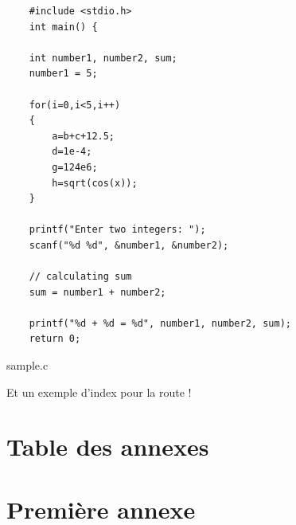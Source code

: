 \documentclass[a4paper,11pt]{report}    %
\begin{document}
\begin{listing}[H]
\begin{verbatim}
    #include <stdio.h>
    int main() {

    int number1, number2, sum;
    number1 = 5;

    for(i=0,i<5,i++)
    {
        a=b+c+12.5;
        d=1e-4;
        g=124e6;
        h=sqrt(cos(x));
    }

    printf("Enter two integers: ");
    scanf("%d %d", &number1, &number2);

    // calculating sum
    sum = number1 + number2;

    printf("%d + %d = %d", number1, number2, sum);
    return 0;
\end{verbatim}
\caption{sample.c}
\label{lst:sample.c}
\end{listing}

Et un exemple d'index pour la route !



\newpage
\listoffigures

\newpage
\listoftables

\newpage
\listofmyequations

\newpage
\listoflistings

\newpage
\printindex

\newpage
\printbibliography[heading=bibintoc]



\begin{appendices}

\chapter*{Table des annexes}
\startcontents[chapter]

\chapter{Première annexe}

\cite{CitekeyBook}



\end{appendices}

\end{document}
